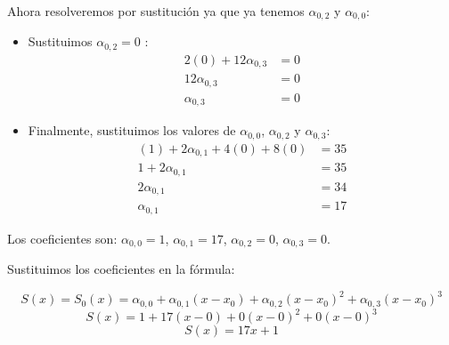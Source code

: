 \documentclass{article}
\begin{document}
Ahora resolveremos por sustitución ya que ya tenemos \(\alpha_{0,2}\) y \(\alpha_{0,0}\):
\begin{itemize}
    \item Sustituimos \(\alpha_{0,2}=0\) :
    \begin{align*}
    2(0) + 12\alpha_{0,3} &= 0 \\
    12\alpha_{0,3} &= 0 \\
    \alpha_{0,3} &= 0
    \end{align*}
    \item Finalmente, sustituimos los valores de \(\alpha_{0,0}\), \(\alpha_{0,2}\) y \(\alpha_{0,3}\):
    \begin{align*}
    (1) + 2\alpha_{0,1} + 4(0) + 8(0) &= 35 \\
    1 + 2\alpha_{0,1} &= 35 \\
    2\alpha_{0,1} &= 34 \\
    \alpha_{0,1} &= 17
    \end{align*}
\end{itemize}
Los coeficientes son: \(\alpha_{0,0} = 1\), \(\alpha_{0,1} = 17\), \(\alpha_{0,2} = 0\), \(\alpha_{0,3} = 0\).

Sustituimos los coeficientes en la fórmula:

$$ S(x) = S_0(x) = \alpha_{0,0} + \alpha_{0,1}(x-x_0) + \alpha_{0,2}(x-x_0)^2 + \alpha_{0,3}(x-x_0)^3 $$
$$ S(x) = 1 + 17(x-0) + 0(x-0)^2 + 0(x-0)^3 $$
$$ \boxed{S(x) = 17x + 1} $$
\end{document}

